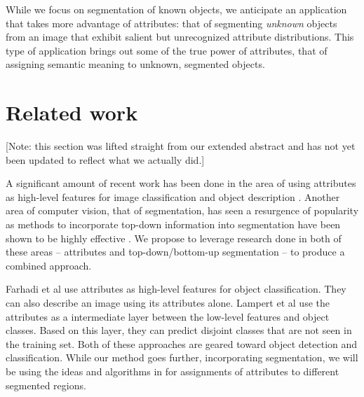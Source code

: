 \documentclass[10pt,twocolumn,letterpaper]{article}
\begin{document}
While we focus on segmentation of known objects, we anticipate an application
that takes more advantage of attributes: that of segmenting \emph{unknown}
objects from an image that exhibit salient but unrecognized attribute
distributions.  This type of application brings out some of the true power of
attributes, that of assigning semantic meaning to unknown, segmented objects.


\section{Related work}
\label{sec:related_work}
[Note: this section was lifted straight from our extended abstract
and has not yet been updated to reflect what we actually did.]

A significant amount of recent work has been done in the area of using
attributes as high-level features for image classification and object
description \cite{farhadi09, lampert09, kumar09}.  
Another area of computer vision, that of segmentation,
has seen a resurgence of popularity as methods to incorporate top-down
information into segmentation have been shown to be highly effective
\cite{borenstein04, pantofaru, gu09, russell06, malisiewicz, leibe04, hoiem05, shotton06}.  
We propose to leverage research done in both of these areas -- attributes
and top-down/bottom-up segmentation -- to produce a combined approach.

Farhadi et al
\cite{farhadi09} use attributes as high-level features for object classification. They
can also describe an image using its attributes alone.
Lampert et al \cite{lampert09}
use the attributes as a intermediate layer between the low-level
features and object classes. Based on this layer, they can predict
disjoint classes that are not seen in the training set.  Both of these
approaches are geared toward object detection and classification.  While
our method goes further, incorporating segmentation, we will be using
the ideas and algorithms in \cite{farhadi09} for assignments of 
attributes to different segmented regions.
\end{document}
